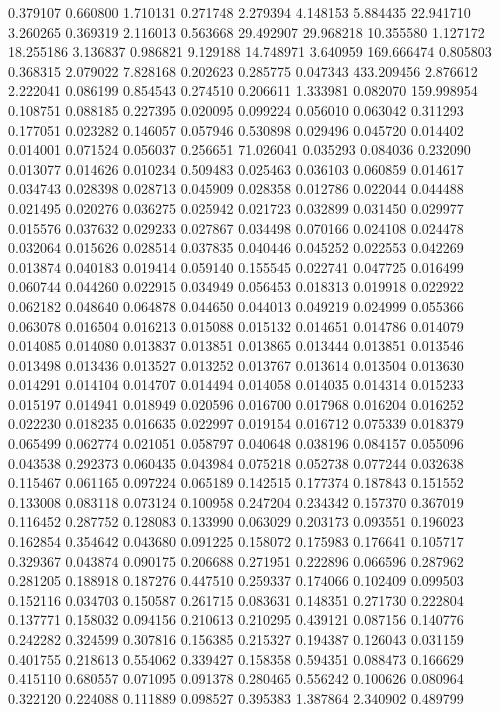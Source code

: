 0.379107
0.660800
1.710131
0.271748
2.279394
4.148153
5.884435
22.941710
3.260265
0.369319
2.116013
0.563668
29.492907
29.968218
10.355580
1.127172
18.255186
3.136837
0.986821
9.129188
14.748971
3.640959
169.666474
0.805803
0.368315
2.079022
7.828168
0.202623
0.285775
0.047343
433.209456
2.876612
2.222041
0.086199
0.854543
0.274510
0.206611
1.333981
0.082070
159.998954
0.108751
0.088185
0.227395
0.020095
0.099224
0.056010
0.063042
0.311293
0.177051
0.023282
0.146057
0.057946
0.530898
0.029496
0.045720
0.014402
0.014001
0.071524
0.056037
0.256651
71.026041
0.035293
0.084036
0.232090
0.013077
0.014626
0.010234
0.509483
0.025463
0.036103
0.060859
0.014617
0.034743
0.028398
0.028713
0.045909
0.028358
0.012786
0.022044
0.044488
0.021495
0.020276
0.036275
0.025942
0.021723
0.032899
0.031450
0.029977
0.015576
0.037632
0.029233
0.027867
0.034498
0.070166
0.024108
0.024478
0.032064
0.015626
0.028514
0.037835
0.040446
0.045252
0.022553
0.042269
0.013874
0.040183
0.019414
0.059140
0.155545
0.022741
0.047725
0.016499
0.060744
0.044260
0.022915
0.034949
0.056453
0.018313
0.019918
0.022922
0.062182
0.048640
0.064878
0.044650
0.044013
0.049219
0.024999
0.055366
0.063078
0.016504
0.016213
0.015088
0.015132
0.014651
0.014786
0.014079
0.014085
0.014080
0.013837
0.013851
0.013865
0.013444
0.013851
0.013546
0.013498
0.013436
0.013527
0.013252
0.013767
0.013614
0.013504
0.013630
0.014291
0.014104
0.014707
0.014494
0.014058
0.014035
0.014314
0.015233
0.015197
0.014941
0.018949
0.020596
0.016700
0.017968
0.016204
0.016252
0.022230
0.018235
0.016635
0.022997
0.019154
0.016712
0.075339
0.018379
0.065499
0.062774
0.021051
0.058797
0.040648
0.038196
0.084157
0.055096
0.043538
0.292373
0.060435
0.043984
0.075218
0.052738
0.077244
0.032638
0.115467
0.061165
0.097224
0.065189
0.142515
0.177374
0.187843
0.151552
0.133008
0.083118
0.073124
0.100958
0.247204
0.234342
0.157370
0.367019
0.116452
0.287752
0.128083
0.133990
0.063029
0.203173
0.093551
0.196023
0.162854
0.354642
0.043680
0.091225
0.158072
0.175983
0.176641
0.105717
0.329367
0.043874
0.090175
0.206688
0.271951
0.222896
0.066596
0.287962
0.281205
0.188918
0.187276
0.447510
0.259337
0.174066
0.102409
0.099503
0.152116
0.034703
0.150587
0.261715
0.083631
0.148351
0.271730
0.222804
0.137771
0.158032
0.094156
0.210613
0.210295
0.439121
0.087156
0.140776
0.242282
0.324599
0.307816
0.156385
0.215327
0.194387
0.126043
0.031159
0.401755
0.218613
0.554062
0.339427
0.158358
0.594351
0.088473
0.166629
0.415110
0.680557
0.071095
0.091378
0.280465
0.556242
0.100626
0.080964
0.322120
0.224088
0.111889
0.098527
0.395383
1.387864
2.340902
0.489799

